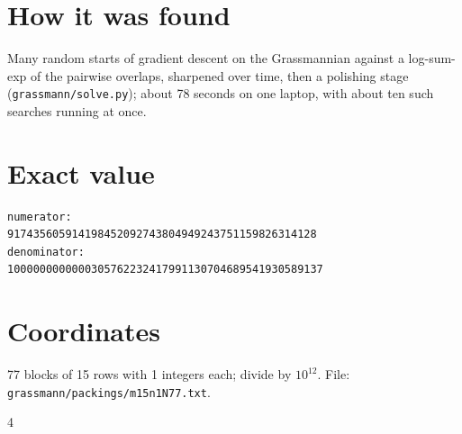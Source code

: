\documentclass[11pt,a4paper]{article}
\begin{document}
\section{How it was found}
Many random starts of gradient descent on the Grassmannian against a log-sum-exp of the pairwise overlaps, sharpened over time, then a polishing stage (\texttt{grassmann/solve.py}); about 78 seconds on one laptop, with about ten such searches running at once.


\appendix
\section{Exact value}
{\small
\begin{verbatim}
numerator:
917435605914198452092743804949243751159826314128
denominator:
1000000000000305762232417991130704689541930589137
\end{verbatim}}

\section{Coordinates}
77 blocks of 15 rows with 1 integers each; divide by $10^{12}$. File: \texttt{grassmann/packings/m15n1N77.txt}.
{\tiny
\begin{multicols}{4}
\end{multicols}}
\end{document}
